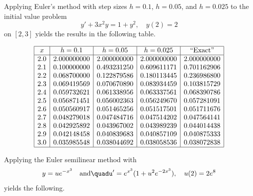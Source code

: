 \documentclass{ximera}
\begin{document}
\begin{example}\label{example:3.1.6}
Applying Euler's method with step sizes $h=0.1$, $h=0.05$, and
$h=0.025$ to  the initial value problem
\begin{equation}\label{eq:3.1.26}
y'+3x^2y=1+y^2,\quad y(2)=2
\end{equation}
on  $[2,3]$ yields the results in the following table. 

$$
\begin{array}{|c|c|c|c|c|}
\hline
x&
h=0.1&
h=0.05&
h=0.025&
\text{``Exact''} \\ \hline
2.0 &2.000000000 & 2.000000000 & 2.000000000 & 2.000000000 \\
2.1 &0.100000000 & 0.493231250 & 0.609611171 & 0.701162906 \\
2.2 &0.068700000 & 0.122879586 & 0.180113445 & 0.236986800 \\
2.3 &0.069419569 & 0.070670890 & 0.083934459 & 0.103815729 \\
2.4 &0.059732621 & 0.061338956 & 0.063337561 & 0.068390786 \\
2.5 &0.056871451 & 0.056002363 & 0.056249670 & 0.057281091 \\
2.6 &0.050560917 & 0.051465256 & 0.051517501 & 0.051711676 \\
2.7 &0.048279018 & 0.047484716 & 0.047514202 & 0.047564141 \\
2.8 &0.042925892 & 0.043967002 & 0.043989239 & 0.044014438 \\
2.9 &0.042148458 & 0.040839683 & 0.040857109 & 0.040875333 \\
3.0 &0.035985548 & 0.038044692 & 0.038058536 & 0.038072838 \\
\hline
\end{array}
$$


Applying the Euler semilinear method with
$$
y=ue^{-x^3}\quad\mbox{and}\quadu'=e^{x^3}(1+u^2e^{-2x^3}),\quad
u(2)=2e^8
$$
yields the following. 


\end{example}
\end{document}
